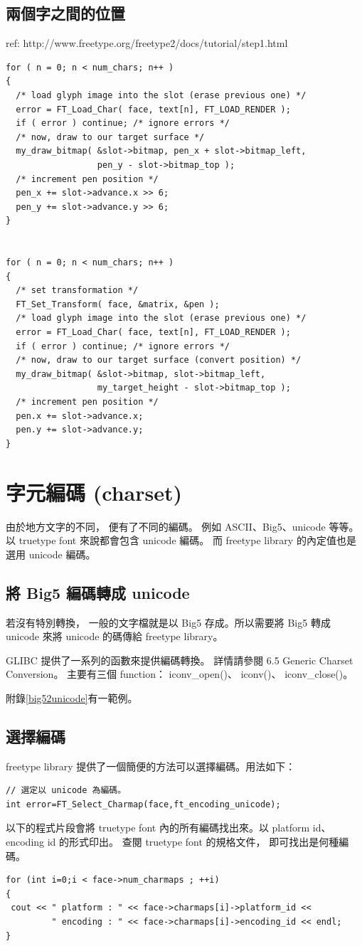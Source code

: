 \documentclass[12pt,a4]{article}
\begin{document}
\begin{CJK}{UTF8}{bsmi}
\subsection{兩個字之間的位置}
ref: http://www.freetype.org/freetype2/docs/tutorial/step1.html
\begin{Verbatim}[commandchars=@\[\]]
for ( n = 0; n < num_chars; n++ ) 
{ 
  /* load glyph image into the slot (erase previous one) */ 
  error = FT_Load_Char( face, text[n], FT_LOAD_RENDER ); 
  if ( error ) continue; /* ignore errors */ 
  /* now, draw to our target surface */ 
  my_draw_bitmap( &slot->bitmap, pen_x + slot->bitmap_left, 
                  pen_y - slot->bitmap_top ); 
  /* increment pen position */ 
  pen_x += slot->advance.x >> 6; 
  pen_y += slot->advance.y >> 6; 
}


for ( n = 0; n < num_chars; n++ ) 
{ 
  /* set transformation */ 
  FT_Set_Transform( face, &matrix, &pen ); 
  /* load glyph image into the slot (erase previous one) */ 
  error = FT_Load_Char( face, text[n], FT_LOAD_RENDER ); 
  if ( error ) continue; /* ignore errors */ 
  /* now, draw to our target surface (convert position) */ 
  my_draw_bitmap( &slot->bitmap, slot->bitmap_left, 
                  my_target_height - slot->bitmap_top ); 
  /* increment pen position */ 
  pen.x += slot->advance.x; 
  pen.y += slot->advance.y; 
}
\end{Verbatim}

\newpage
\section{字元編碼 (charset)}
由於地方文字的不同， 便有了不同的編碼。 例如 ASCII、Big5、unicode 等等。
以 truetype font 來說都會包含 unicode 編碼。 而 freetype library 的內定值也是選用 
unicode 編碼。
\subsection{將 Big5 編碼轉成 unicode}
若沒有特別轉換， 一般的文字檔就是以 Big5 存成。所以需要將 Big5 轉成 unicode 
來將 unicode 的碼傳給 freetype library。

GLIBC 提供了一系列的函數來提供編碼轉換。 詳情請參閱\cite{glibc}
6.5 Generic Charset Conversion。 主要有三個 function： iconv\_{}open()、 iconv()、 
iconv\_{}close()。

附錄\ref{big52unicode}有一範例。
\subsection{選擇編碼}
freetype library 提供了一個簡便的方法可以選擇編碼。用法如下：
\begin{Verbatim}[commandchars=@\[\]]
// 選定以 unicode 為編碼。
int error=FT_Select_Charmap(face,ft_encoding_unicode);
\end{Verbatim}
以下的程式片段會將 truetype font 內的所有編碼找出來。以 platform id、 encoding id
的形式印出。 查閱 truetype font 的規格文件， 即可找出是何種編碼。
\begin{Verbatim}[commandchars=@\$?]
for (int i=0;i < face->num_charmaps ; ++i)
{
 cout << " platform : " << face->charmaps[i]->platform_id << 
         " encoding : " << face->charmaps[i]->encoding_id << endl;
}


\end{Verbatim}
\end{CJK}
\end{document}

